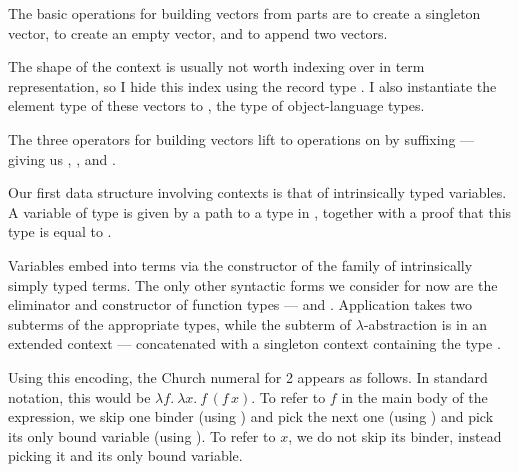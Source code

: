 
The basic operations for building vectors from parts are \AgdaFunction{[\_]} to
create a singleton vector, \AgdaFunction{[]} to create an empty vector, and
\AgdaFunction{\_++\_} to append two vectors.

The shape of the context is usually not worth indexing over in term
representation, so I hide this index using the record type .
I also instantiate the element type of these vectors to , the
type of object-language types.

\Ctx{}

The three operators for building vectors lift to operations on 
by suffixing  --- giving us ,
, and .

Our first data structure involving contexts is that of intrinsically typed
variables.
A variable of type
\AgdaBound{$\Gamma$}\AgdaSpace{}\AgdaRecord{$\ni$}\AgdaSpace{}
is given by a path  to a type in \AgdaBound{$\Gamma$}, together
with a proof  that this type is equal to .

\Var{}

Variables embed into terms via the  constructor of
the family  of intrinsically simply typed terms.
The only other syntactic forms we consider for now are the eliminator and
constructor of function types  ---
 and .
Application  takes two subterms of the appropriate
types, while the subterm of $\lambda$-abstraction 
is in an extended context \GA{} --- \AgdaBound{$\Gamma$} concatenated with a
singleton context containing the type .

\Term{}

Using this encoding, the Church numeral for 2 appears as follows.
In standard notation, this would be
$\lambda f.~\lambda x.~f\,(f\,x)$.
To refer to $f$ in the main body of the expression, we skip one binder (using
\AgdaInductiveConstructor{$\swarrow$}) and pick the next one
(using \AgdaInductiveConstructor{$\searrow$}) and pick its only bound variable
(using ).
To refer to $x$, we do not skip its binder, instead picking it and its only
bound variable.

